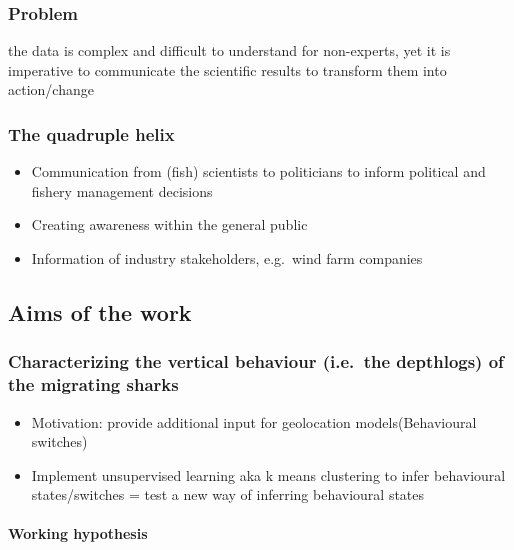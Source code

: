 \documentclass[
  authoryear,
  review,
  3p]{elsarticle}
\let\oldparagraph\paragraph
\renewcommand{\paragraph}[1]{\oldparagraph{#1}\mbox{}}
\providecommand{\tightlist}{%
  \setlength{\itemsep}{0pt}\setlength{\parskip}{0pt}}\usepackage{longtable,booktabs,array}
\begin{document}
\hypertarget{problem}{%
\subsubsection{Problem}\label{problem}}

the data is complex and difficult to understand for non-experts, yet it
is imperative to communicate the scientific results to transform them
into action/change

\hypertarget{the-quadruple-helix}{%
\subsubsection{The quadruple helix}\label{the-quadruple-helix}}

\begin{itemize}
\tightlist
\item
  Communication from (fish) scientists to politicians to inform
  political and fishery management decisions
\item
  Creating awareness within the general public
\item
  Information of industry stakeholders, e.g.~wind farm companies
\end{itemize}

\hypertarget{aims-of-the-work}{%
\subsection{Aims of the work}\label{aims-of-the-work}}

\hypertarget{characterizing-the-vertical-behaviour-i.e.-the-depthlogs-of-the-migrating-sharks}{%
\subsubsection{Characterizing the vertical behaviour (i.e.~the
depthlogs) of the migrating
sharks}\label{characterizing-the-vertical-behaviour-i.e.-the-depthlogs-of-the-migrating-sharks}}

\begin{itemize}
\tightlist
\item
  Motivation: provide additional input for geolocation
  models(Behavioural switches)
\item
  Implement unsupervised learning aka k means clustering to infer
  behavioural states/switches = test a new way of inferring behavioural
  states
\end{itemize}

\hypertarget{working-hypothesis}{%
\paragraph{Working hypothesis}\label{working-hypothesis}}
\end{document}

